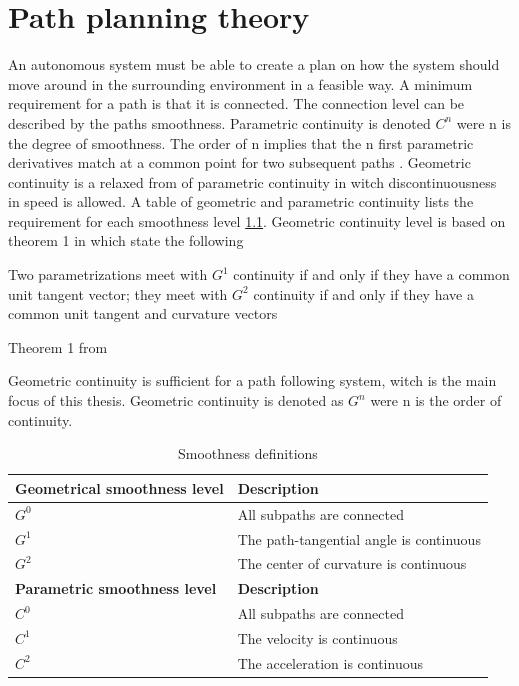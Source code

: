 \chapter{Path planning theory}
An autonomous system must be able to create a plan on how the system should move around in the surrounding environment in a feasible way. A minimum requirement for a path is that it is connected. The connection level can be described by the paths smoothness.
Parametric continuity is denoted $C^n$ were n is the degree of smoothness. The order of n implies that the n first parametric derivatives match at a common point for two subsequent paths \citep{barsky1989geometric}. Geometric continuity is a relaxed from of parametric continuity in witch discontinuousness in speed is allowed. A table of geometric and parametric continuity lists the requirement for each smoothness level \ref{TB:SmoothnessDescriptions}. Geometric continuity level is based on theorem 1 in \citep{barsky1989geometric} which state the following
\begin{theorem}
Two parametrizations meet with $G^1$ continuity if and only if they have a common unit tangent vector; they meet with $G^2$ continuity if and only if they have a common unit tangent and curvature vectors
\caption{Theorem 1 from \citep{barsky1989geometric}} 
\end{theorem}
Geometric continuity is sufficient for a path following system, witch is the main focus of this thesis. Geometric continuity is denoted as $G^n$ were n is the order of continuity.

\begin{table}[H]
\begin{center}
\begin{tabular}{| l | | l |}
\hline
\textbf{Geometrical smoothness level} & \textbf{Description} \\ \hline
$G^0$ & All subpaths are connected \\ \hline
$G^1$ & The path-tangential angle is continuous \\ \hline
$G^2$ & The center of curvature is continuous \\ \hline
\textbf{Parametric smoothness level} & \textbf{Description} \\ \hline
$C^0$ & All subpaths are connected \\ \hline
$C^1$ & The velocity is continuous \\ \hline
$C^2$ & The acceleration is continuous \\ \hline
\end{tabular}
\end{center}
\caption{Smoothness definitions}
\label{TB:SmoothnessDescriptions}
\end{table} 


